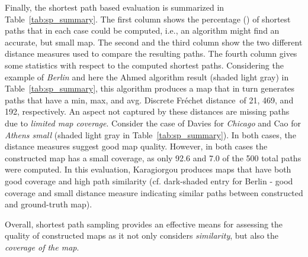 \documentclass[natbib]{svjour3}                    \smartqed  \usepackage[table]{xcolor}
\newcommand{\Frd}{Fr\'echet distance}
\begin{document}
Finally, the shortest path based evaluation is summarized in Table~\ref{tab:sp_summary}. The first column shows the percentage () of shortest paths that in each case could be computed, i.e., an algorithm might find an accurate, but small map. The second and the third column show the two different distance measures used to compare the resulting paths. The fourth column gives some statistics with respect to the computed shortest paths.
Considering the example of \emph{Berlin} and here the Ahmed algorithm result (shaded light gray) in Table~\ref{tab:sp_summary}, this algorithm produces a map that in turn generates paths that have a min, max, and avg. Discrete \Frd\ of 21, 469, and 192, respectively. 
An aspect not captured by these distances are missing paths due to \emph{limited map coverage}. Consider the case of Davies for \emph{Chicago} and Cao for \emph{Athens small} (shaded light gray in Table~\ref{tab:sp_summary}). In both cases, the distance measures suggest good map quality. However, in both cases the constructed map has a small coverage, as only 92.6 and 7.0 of the 500 total paths were computed. In this evaluation, Karagiorgou produces maps that have both good coverage and high path similarity (cf. dark-shaded entry for Berlin - good coverage and small distance measure indicating similar paths between constructed and ground-truth map).


Overall, shortest path sampling provides an effective means for assessing the quality of constructed maps as it not only considers \emph{similarity}, but also the \emph{coverage of the map}.
\end{document}

